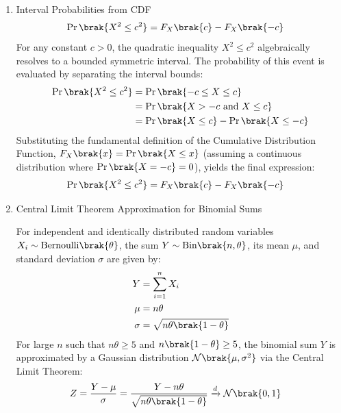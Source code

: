 \begin{enumerate}[label=\thesubsection.\arabic*, ref=\thesubsection.\theenumi]
	\item Interval Probabilities from CDF
	\begin{align}
		\Pr\brak{X^2 \le c^2} &= F_X\brak{c} - F_X\brak{-c} \label{eq:DA2025-interval_cdf}
	\end{align}
	\solution
	For any constant $c > 0$, the quadratic inequality $X^2 \le c^2$ algebraically resolves to a bounded symmetric interval. The probability of this event is evaluated by separating the interval bounds:
	\begin{align}
		\Pr\brak{X^2 \le c^2} &= \Pr\brak{-c \le X \le c}
		\\
		&= \Pr\brak{X > -c \text{ and } X \le c}
		\\
		&= \Pr\brak{X \le c} - \Pr\brak{X \le -c}
	\end{align}
	Substituting the fundamental definition of the Cumulative Distribution Function, $F_X\brak{x} = \Pr\brak{X \le x}$ (assuming a continuous distribution where $\Pr\brak{X = -c} = 0$), yields the final expression:
	\begin{align}
		\Pr\brak{X^2 \le c^2} &= F_X\brak{c} - F_X\brak{-c}
	\end{align}
	
\item Central Limit Theorem Approximation for Binomial Sums

For independent and identically distributed random variables $X_i \sim \text{Bernoulli}\brak{\theta}$, the sum $Y \sim \text{Bin}\brak{n, \theta}$, its mean $\mu$, and standard deviation $\sigma$ are given by:
\begin{align}
	Y &= \sum_{i=1}^n X_i \label{eq:DA2025-binomial_sum_def}
	\\
	\mu &= n\theta \label{eq:DA2025-binomial_sum_mean}
	\\
	\sigma &= \sqrt{n\theta\brak{1-\theta}} \label{eq:DA2025-binomial_sum_std}
\end{align}
For large $n$ such that $n\theta \ge 5$ and $n\brak{1-\theta} \ge 5$, the binomial sum $Y$ is approximated by a Gaussian distribution $\mathcal{N}\brak{\mu, \sigma^2}$ via the Central Limit Theorem:
\begin{align}
	Z &= \frac{Y - \mu}{\sigma} = \frac{Y - n\theta}{\sqrt{n\theta\brak{1-\theta}}} \xrightarrow{d} \mathcal{N}\brak{0, 1} \label{eq:DA2025-clt_z_standard}
\end{align}


\end{enumerate}
